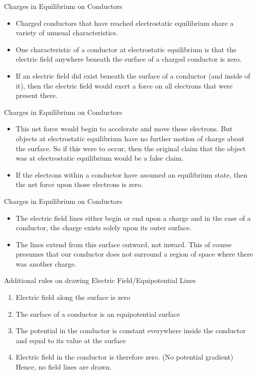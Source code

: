 \documentclass{beamer}
\begin{document}
\begin{frame}{Charges in Equilibrium on Conductors}{}
  \begin{itemize}
  \item Charged conductors that have reached electrostatic equilibrium share a variety of unusual characteristics. 
  \item One characteristic of a conductor at electrostatic equilibrium is that the electric field anywhere beneath the surface of a charged conductor is zero. 
  \item If an electric field did exist beneath the surface of a conductor (and inside of it), then the electric field would exert a force on all electrons that were present there. 
  \end{itemize}
\end{frame}

\begin{frame}{Charges in Equilibrium on Conductors}{}
  \begin{itemize}
  \item This net force would begin to accelerate and move these electrons. But objects at electrostatic equilibrium have no further motion of charge about the surface. So if this were to occur, then the original claim that the object was at electrostatic equilibrium would be a false claim.
  \item If the electrons within a conductor have assumed an equilibrium state, then the net force upon those electrons is zero. 
  \end{itemize}
\end{frame}

\begin{frame}{Charges in Equilibrium on Conductors}{}
  \begin{itemize}
   \item The electric field lines either begin or end upon a charge and in the case of a conductor, the charge exists solely upon its outer surface. 
  \item The lines extend from this surface outward, not inward. This of course presumes that our conductor does not surround a region of space where there was another charge.
  \end{itemize}
\end{frame}

\begin{frame}{Additional rules on drawing Electric Field/Equipotential Lines}{}
  \begin{enumerate}
   \item Electric field along the surface is zero
   \item The surface of a conductor is an equipotential surface
   \item The potential in the conductor is constant everywhere inside the conductor and equal to its value at the surface
   \item Electric field in the conductor is therefore zero. (No potential gradient) Hence, no field lines are drawn.
  \end{enumerate}
\end{frame}
\end{document}
